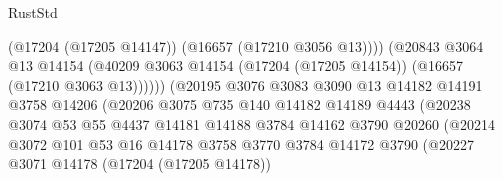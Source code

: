 \begin{lexlean}{RustStd}
\begin{coremodule}
                                            (@17204 (@17205 @14147))
                                            (@16657 (@17210 @3056 @13))))
                                        (@20843
                                          @3064
                                          @13
                                          @14154
                                          (@40209
                                            @3063
                                            @14154
                                            (@17204 (@17205 @14154))
                                            (@16657 (@17210 @3063 @13))))))
                                    (@20195
                                      @3076
                                      @3083
                                      @3090
                                      @13
                                      @14182
                                      @14191
                                      @3758
                                      @14206
                                      (@20206
                                        @3075
                                        @735
                                        @140
                                        @14182
                                        @14189
                                        @4443
                                        (@20238
                                          @3074
                                          @53
                                          @55
                                          @4437
                                          @14181
                                          @14188
                                          @3784
                                          @14162
                                          @3790
                                          @20260
                                          (@20214
                                            @3072
                                            @101
                                            @53
                                            @16
                                            @14178
                                            @3758
                                            @3770
                                            @3784
                                            @14172
                                            @3790
                                            (@20227
                                              @3071
                                              @14178
                                              (@17204 (@17205 @14178))

\end{coremodule}
\end{lexlean}
